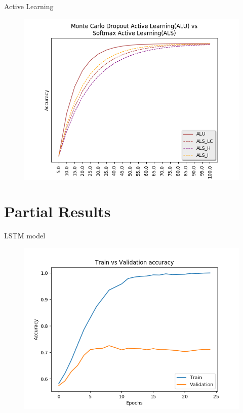 \documentclass[10pt]{beamer}
\begin{document}
\begin{frame}[fragile]{Active Learning}
    \begin{figure}[htp]
        \centering
        \includegraphics[scale=0.6]{images/active_learning_selection_comp_graph.png}
    \end{figure}
\end{frame}

\section{Partial Results}

\begin{frame}[fragile]{LSTM model}
    \begin{figure}[htp]
        \centering
        \includegraphics[scale=0.6]{images/parcial_results.png}
    \end{figure}
\end{frame}
\end{document}
